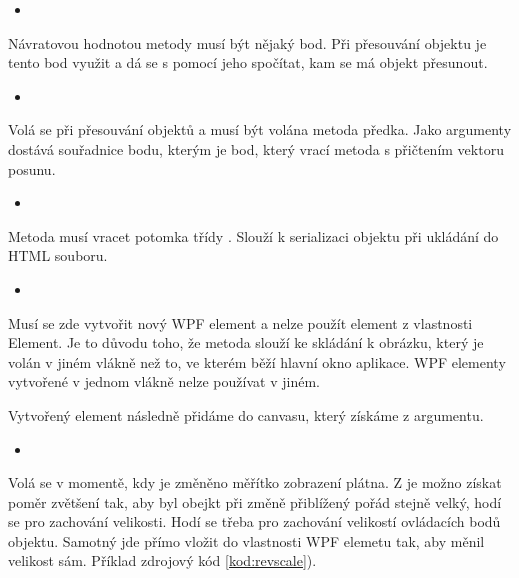 \documentclass[
  field=inf,
  biblatex,
  glossaries,
  index
]{kidiplom}
\begin{document}
\begin{itemize}
\item {}
\end{itemize}
Návratovou hodnotou metody musí být nějaký bod. Při přesouvání objektu je tento bod využit a dá se s pomocí jeho spočítat, kam se má objekt přesunout.

\begin{itemize}
\item {}
\end{itemize}
Volá se při přesouvání objektů a musí být volána metoda předka. Jako argumenty dostává souřadnice bodu, kterým je bod, který vrací metoda  s přičtením vektoru posunu.

\begin{itemize}
\item {}
\end{itemize}
Metoda musí vracet potomka třídy . Slouží k serializaci objektu při ukládání do HTML souboru.

\begin{itemize}
\item {}
\end{itemize}
Musí se zde vytvořit nový WPF element a nelze použít element z vlastnosti Element. Je to důvodu toho, že metoda slouží ke skládání k obrázku, který je volán v jiném vlákně než to, ve kterém běží hlavní okno aplikace. WPF elementy vytvořené v jednom vlákně nelze používat v jiném.

Vytvořený element následně přidáme do canvasu, který získáme z argumentu.

\begin{itemize}
\item {}
\end{itemize}

Volá se v momentě, kdy je změněno měřítko zobrazení plátna. Z  je možno získat poměr zvětšení tak, aby byl obejkt při změně přiblížený pořád stejně velký, hodí se pro zachování velikosti. Hodí se třeba pro zachování velikostí ovládacích bodů objektu. Samotný  jde přímo vložit do vlastnosti WPF elemetu tak, aby měnil velikost sám. Příklad zdrojový kód \ref{kod:revscale}).
\end{document}
